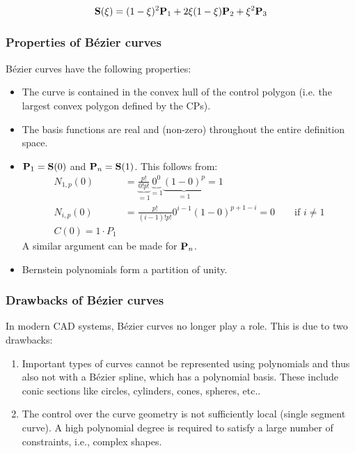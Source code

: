 \documentclass[11pt,a4paper]{article}
\begin{document}
	\begin{align}
        {\bf S}(\xi)=(1-\xi)^{2}{\bf P}_{1}+2\xi (1-\xi){ \bf P}_{2}+\xi^{2}{\bf P}_{3}
	\end{align}



\subsubsection{Properties of Bézier curves}

Bézier curves have the following properties:
	\begin{itemize}
		\item The curve is contained in the convex hull of the control polygon (i.e. the largest convex polygon defined by the CPs).
		\item The basis functions are real and (non-zero) throughout the entire definition space.
		\item ${\bf P}_{1}={\bf S}(0)$ and ${\bf P}_{n}={\bf S}(1)$. This follows from:
		\begin{align*}
			N_{1,p}(0)&=\underbrace{\frac{p!}{0!p!}}_{=1}\underbrace{0^{0}}_{=1}\underbrace{(1-0)^{p}}_{=1}=1 \\
			N_{i,p}(0)&=\frac{p!}{(i-1)!p!}0^{i-1}(1-0)^{p+1-i}=0\qquad\text{if }i\neq 1 \\
			C(0)=1\cdot P_{1}
		\end{align*}
        A similar argument can be made for ${\bf P}_n$.

		\item Bernstein polynomials form a partition  of unity.

	\end{itemize}

	\subsubsection{Drawbacks of Bézier curves}

In modern CAD systems, Bézier curves no longer play a role. This is due to two drawbacks:

	\begin{enumerate}
		\item Important types of curves cannot be represented using polynomials and thus also not with a Bézier spline, which has a polynomial basis. These include conic sections like circles, cylinders, cones, spheres, etc..
		\item The control over the curve geometry is not sufficiently local (single segment curve). A high polynomial degree is required to satisfy a large number of constraints, i.e., complex shapes.
	\end{enumerate}
\end{document}

